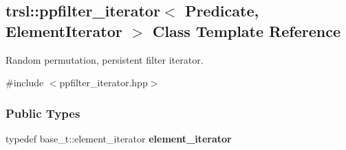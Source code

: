 \hypertarget{classtrsl_1_1ppfilter__iterator}{
\subsection{trsl::ppfilter\_\-iterator$<$ Predicate, ElementIterator $>$ Class Template Reference}
\label{classtrsl_1_1ppfilter__iterator}
}


Random permutation, persistent filter iterator.  


{\ttfamily \#include $<$ppfilter\_\-iterator.hpp$>$}\subsubsection*{Public Types}
\begin{DoxyCompactItemize}
\item 
\hypertarget{classtrsl_1_1ppfilter__iterator_aaf6381837631e4f5958062691e195c8d}{
typedef base\_\-t::element\_\-iterator {\bfseries element\_\-iterator}}
\label{classtrsl_1_1ppfilter__iterator_aaf6381837631e4f5958062691e195c8d}

\end{DoxyCompactItemize}
